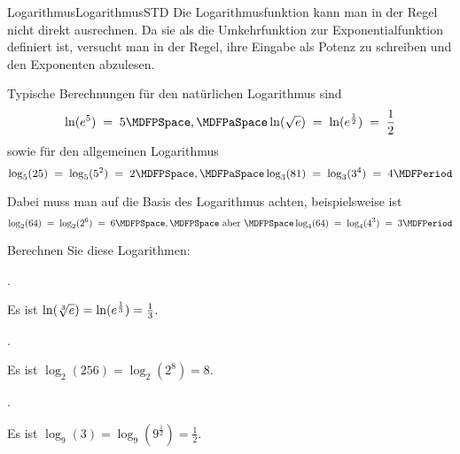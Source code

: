 \begin{MXContent}{Logarithmus}{Logarithmus}{STD}
Die Logarithmusfunktion kann man in der Regel nicht direkt ausrechnen. Da sie als die Umkehrfunktion zur Exponentialfunktion definiert ist, versucht man in der Regel, ihre Eingabe als Potenz zu schreiben
und den Exponenten abzulesen.

\begin{MExample}
Typische Berechnungen für den natürlichen Logarithmus sind
$$
\ln(\MEU^5) \;=\; 5\MDFPSpace, \MDFPaSpace \ln(\sqrt{\MEU}) \;=\; \ln(\MEU^{\frac12}) \;=\; \frac12
$$
sowie für den allgemeinen Logarithmus
$$
\log_5(25) \;=\; \log_5(5^2) \;=\; 2 \MDFPSpace, \MDFPaSpace \log_3(81) \;=\; \log_3(3^4) \;=\; 4 \MDFPeriod
$$
\end{MExample}

Dabei muss man auf die Basis des Logarithmus achten, beispielsweise ist
$$
\log_2(64) \;=\; \log_2(2^6) \;=\; 6 \MDFPSpace,\MDFPSpace \text{ aber }\MDFPSpace
\log_4(64) \;=\; \log_4(4^3) \;=\; 3 \MDFPeriod
$$

\begin{MExercise}
Berechnen Sie diese Logarithmen:
\begin{MExerciseItems}
\item{. \begin{MHint}{\iSolution}Es ist $\ln(\sqrt[3]{e})=\ln(e^{\frac13})=\frac13$.\end{MHint}}
\item{. \begin{MHint}{\iSolution}Es ist $\log_2(256)=\log_2(2^8)=8$.\end{MHint}}
\item{. \begin{MHint}{\iSolution}Es ist $\log_9(3)=\log_9(9^{\frac12})=\frac12$.\end{MHint}}
\end{MExerciseItems}
\end{MExercise}


\end{MXContent}
